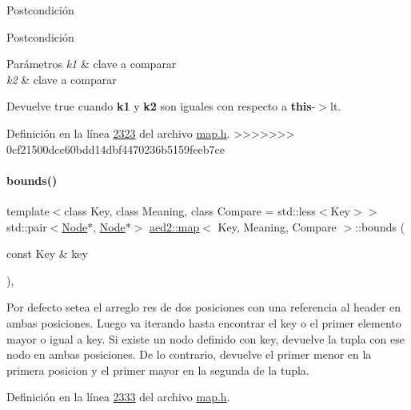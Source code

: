 \begin{DoxyPostcond}{\-Postcondición}
\begin{DoxyPostcond}{\-Postcondición}
\begin{DoxyParams}{Parámetros}
{\em k1} & clave a comparar \\
\hline
{\em k2} & clave a comparar \\
\hline
\end{DoxyParams}
\begin{DoxyReturn}{Devuelve}
true cuando {\bfseries k1} y {\bfseries k2} son iguales con respecto a {\bfseries this}-\/$>$lt. 
\end{DoxyReturn}


Definición en la línea \hyperlink{map_8h_source_l02323}{2323} del archivo \hyperlink{map_8h_source}{map.\+h}.
>>>>>>> 0cf21500dcc60bdd14dbf4470236b5159feeb7ce

\mbox{\label{classaed2_1_1map_aa079b9390f988f97be26fd51ed44a2c9_aa079b9390f988f97be26fd51ed44a2c9}} 
\paragraph{\texorpdfstring{bounds()}{bounds()}\hspace{0.1cm}{\footnotesize\ttfamily [1/2]}}
{\footnotesize\ttfamily template$<$class Key, class Meaning, class Compare = std\+::less$<$\+Key$>$$>$ \\
std\+::pair$<$\hyperlink{structaed2_1_1map_1_1Node}{Node}$\ast$, \hyperlink{structaed2_1_1map_1_1Node}{Node}$\ast$$>$ \hyperlink{classaed2_1_1map}{aed2\+::map}$<$ Key, Meaning, Compare $>$\+::bounds (\begin{DoxyParamCaption}\item[{const Key \&}]{key }\end{DoxyParamCaption})\hspace{0.3cm}{\ttfamily [inline]}, {\ttfamily [private]}}

Por defecto setea el arreglo res de dos posiciones con una referencia al header en ambas posiciones. Luego va iterando hasta encontrar el key o el primer elemento mayor o igual a key. Si existe un nodo definido con key, devuelve la tupla con ese nodo en ambas posiciones. De lo contrario, devuelve el primer menor en la primera posicion y el primer mayor en la segunda de la tupla. 

Definición en la línea \hyperlink{map_8h_source_l02333}{2333} del archivo \hyperlink{map_8h_source}{map.\+h}.

\mbox{\label{classaed2_1_1map_a76b9671ef411cd38f918cbeadb998199_a76b9671ef411cd38f918cbeadb998199}} 

\end{DoxyPostcond}
\end{DoxyPostcond}
